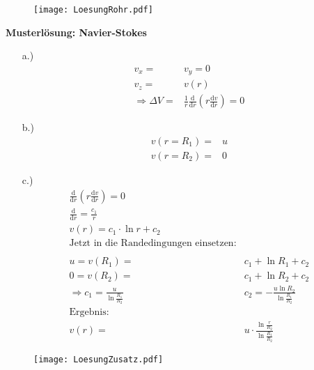 




\begin{figure}[h]
  \texttt{[image: LoesungRohr.pdf]}
\end{figure}

\textbf{Musterlösung: Navier-Stokes}

\begin{itemize}
  \item[a.)]
    \begin{align*}
      v_x =& v_y = 0\\
      v_z =& v(r)\\
      \Rightarrow \Delta V =& \frac{1}{r}\frac{\text{d}}{\text{d}r}
      \left(r\frac{\text{d}v}{\text{d}r}\right) = 0
    \end{align*}
  \item[b.)]
    \begin{align*}
      v(r = R_1) =& u\\
      v(r = R_2) =& 0
    \end{align*}
  \item[c.)]
    \begin{align*}
      \frac{\text{d}}{\text{d}r}
      \left(r\frac{\text{d}v}{\text{d}r}\right) = 0\\
      \frac{\text{d}}{\text{d}r} = \frac{c_1}{r}\\
      v(r) = c_1\cdot \ln{r} + c_2\\
      \text{Jetzt in die Randedingungen einsetzen:}\\
      \\
      u = v(R_1) =& c_1 + \ln{R_1} + c_2\\
      0 = v(R_2) =& c_1 + \ln{R_2} + c_2\\
      \Rightarrow c_1 = \frac{u}{\ln{\frac{R_1}{R_2}}} &
      c_2 = -\frac{u\ln{R_2}}{\ln{\frac{R_1}{R_2}}}\\
      \text{Ergebnis:}\\
      v(r) =& u\cdot\frac{\ln{\frac{r}{R_2}}}{\ln{\frac{R_1}{R_2}}}
    \end{align*}
\end{itemize}

\begin{figure}
  \texttt{[image: LoesungZusatz.pdf]}
\end{figure}


